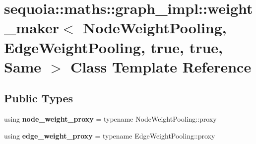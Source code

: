 \hypertarget{classsequoia_1_1maths_1_1graph__impl_1_1weight__maker_3_01_node_weight_pooling_00_01_edge_weightd42e71208bc15661adf908c6dce03949}{}\section{sequoia\+::maths\+::graph\+\_\+impl\+::weight\+\_\+maker$<$ Node\+Weight\+Pooling, Edge\+Weight\+Pooling, true, true, Same $>$ Class Template Reference}
\label{classsequoia_1_1maths_1_1graph__impl_1_1weight__maker_3_01_node_weight_pooling_00_01_edge_weightd42e71208bc15661adf908c6dce03949}
\subsection*{Public Types}
\begin{DoxyCompactItemize}
\item 
\mbox{\label{classsequoia_1_1maths_1_1graph__impl_1_1weight__maker_3_01_node_weight_pooling_00_01_edge_weightd42e71208bc15661adf908c6dce03949_a69c83497a8511373585736524043de53}} 
using {\bfseries node\+\_\+weight\+\_\+proxy} = typename Node\+Weight\+Pooling\+::proxy
\item 
\mbox{\label{classsequoia_1_1maths_1_1graph__impl_1_1weight__maker_3_01_node_weight_pooling_00_01_edge_weightd42e71208bc15661adf908c6dce03949_ae76a52ced26b6e149699b33f5208d242}} 
using {\bfseries edge\+\_\+weight\+\_\+proxy} = typename Edge\+Weight\+Pooling\+::proxy
\end{DoxyCompactItemize}
